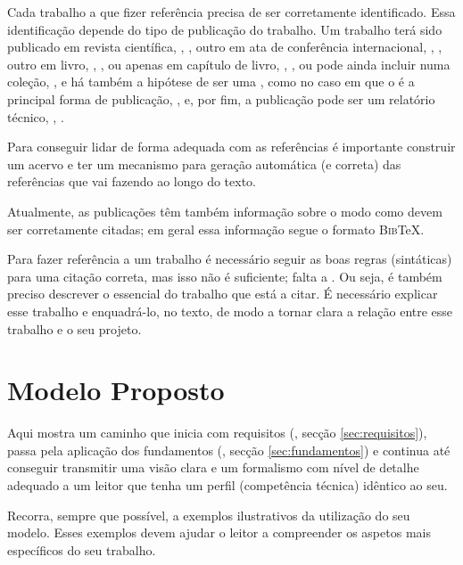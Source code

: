 Cada trabalho a que fizer referência precisa de ser corretamente identificado. Essa identificação depende do tipo de publicação do trabalho. Um trabalho terá sido publicado em revista científica, \eg, \cite{Elzinga_Mills_2011}, outro em ata de conferência internacional, \eg, \cite{Boutilier_et_al_1995}, outro em livro, \eg, \cite{Bellifemine_et_al_2007}, ou apenas em capítulo de livro, \eg, \cite{Wooldridge_2000}, ou pode ainda incluir numa coleção, \eg, \cite{Howard_Matheson_1984} e há também a hipótese de ser uma , como no caso em que o  é a principal forma de publicação, \eg, \cite{Python_2012} e, por fim, a publicação pode ser um relatório técnico, \eg, \cite{Marin_2006}.

Para conseguir lidar de forma adequada com as referências é importante construir um acervo e ter um mecanismo para geração automática (e correta) das referências que vai fazendo ao longo do texto.

Atualmente, as publicações têm também informação sobre o modo como devem ser corretamente citadas; em geral essa informação segue o formato \textsc{Bib}\TeX.

Para fazer referência a um trabalho é necessário seguir as boas regras (sintáticas) para uma citação correta, mas isso não é suficiente; falta a . Ou seja, é também preciso descrever o essencial do trabalho que está a citar. É necessário explicar esse trabalho e enquadrá-lo, no texto, de modo a tornar clara a relação entre esse trabalho e o seu projeto.



\chapter{Modelo Proposto}
\label{ch:modeloProposto}

Aqui mostra um caminho que inicia com requisitos (\cf, secção \ref{sec:requisitos}), passa pela aplicação dos fundamentos (\cf, secção \ref{sec:fundamentos}) e continua até conseguir transmitir uma visão clara e um formalismo com nível de detalhe adequado a um leitor que tenha um perfil (competência técnica) idêntico ao seu.

Recorra, sempre que possível, a exemplos ilustrativos da utilização do seu modelo. Esses exemplos devem ajudar o leitor a compreender os aspetos mais específicos do seu trabalho.


